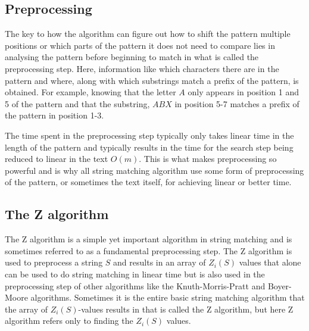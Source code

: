 \subsection{Preprocessing}
The key to how the algorithm can figure out how to shift the pattern multiple positions or which parts of the pattern it does not need to compare lies in analysing the pattern before beginning to match in what is called the preprocessing step. Here, information like which characters there are in the pattern and where, along with which substrings match a prefix of the pattern, is obtained. For example, knowing that the letter $A$ only appears in position 1 and 5 of the pattern and that the substring, $ABX$ in position 5-7 matches a prefix of the pattern in position 1-3. 

The time spent in the preprocessing step typically only takes linear time in the length of the pattern and typically results in the time for the search step being reduced to linear in the text $O(m)$. This is what makes preprocessing so powerful and is why all string matching algorithm use some form of preprocessing of the pattern, or sometimes the text itself, for achieving linear or better time. 

\subsection{The Z algorithm}
The Z algorithm is a simple yet important algorithm in string matching and is sometimes referred to as a fundamental preprocessing step.\cite{Gusfield1997AlgorithmsOS} The Z algorithm is used to preprocess a string $S$ and results in an array of $Z_i(S)$ values that alone can be used to do string matching in linear time but is also used in the preprocessing step of other algorithms like the Knuth-Morris-Pratt and Boyer-Moore algorithms. Sometimes it is the entire basic string matching algorithm that the array of $Z_i(S)$-values results in that is called the Z algorithm, but here Z algorithm refers only to finding the $Z_i(S)$ values. 

